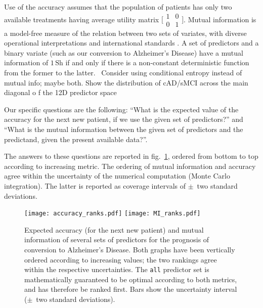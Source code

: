 \documentclass[utf8]{FrontiersinHarvard} %
\newcommand*{\wrench}{{\fontencoding{U}\fontfamily{fontawesomethree}\selectfont\symbol{114}}}
\newcommand{\mynotew}[1]{{\color{notecolour}\wrench\ #1}}
\newcommand*{\fig}{fig.}%
\renewcommand*{\|}[1][]{\nonscript\:#1\vert\nonscript\:\mathopen{}}
\newcommand*{\ad}{Alzheimer's Disease}
\begin{document}
Use of the accuracy assumes that the population of patients has only two available treatments having average utility matrix $\bigl[\begin{smallmatrix}1&0\\0&1\end{smallmatrix}\bigr]$. Mutual information is a model-free measure of the relation between two sets of variates, with diverse operational interpretations \citep{mackay1995_r2005,woodward1953_r1964,minka1998d_r2003,goodetal1968,kelly1956,kullback1959_r1978} and international standards \citep{iso2008c}. A set of predictors and a binary variate (such as our conversion to \ad) have a mutual information of $1\,\mathrm{Sh}$ if and only if there is a non-constant deterministic function from the former to the latter. \mynotew{Consider using conditional entropy instead of mutual info; maybe both. Show the distribution of cAD/sMCI across the main diagonal o f the 12D predictor space}

Our specific questions are the following: \enquote{What is the expected value of the accuracy for the next new patient, if we use the given set of predictors?} and \enquote{What is the mutual information between the given set of predictors and the predictand, given the present available data?}.

The answers to these questions are reported in \fig~\ref{fig:mutual_info}, ordered from bottom to top according to increasing metric. The ordering of mutual information and accuracy agree within the uncertainty of the numerical computation (Monte Carlo integration). The latter is reported as coverage intervals of $\pm$~two standard deviations.
\begin{figure}[!t]%
  \centering%
\texttt{[image: accuracy\_ranks.pdf]}%
\hfill%
\texttt{[image: MI\_ranks.pdf]}%
\caption{Expected accuracy (for the next new patient) and mutual information of several sets of predictors for the prognosis of conversion to \ad. Both graphs have been vertically ordered according to increasing values; the two rankings agree within the respective uncertainties. The \texttt{all} predictor set is mathematically guaranteed to be optimal according to both metrics, and has therefore be ranked first. Bars show the uncertainty interval ($\pm$~two standard deviations).}\label{fig:mutual_info}
\end{figure}%
\end{document}

